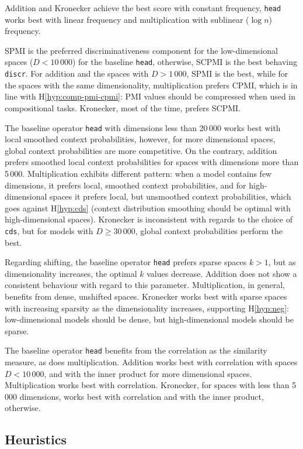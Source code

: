 Addition and Kronecker achieve the best score with constant frequency, \texttt{head} works best with linear frequency and multiplication with sublinear ($\log n$) frequency.

SPMI is the preferred discriminativeness component for the low-dimensional spaces ($D < 10\,000$) for the baseline \texttt{head}, otherwise, SCPMI is the best behaving \texttt{discr}. For addition and the spaces with $D > 1\,000$, SPMI is the best, while for the spaces with the same dimensionality, multiplication prefers CPMI, which is in line with H\ref{hyp:comp-pmi-cpmi}: PMI values should be compressed when used in compositional tasks. Kronecker, most of the time, prefers SCPMI.

The baseline operator \texttt{head} with dimensions less than 20\,000 works best with local smoothed context probabilities, however, for more dimensional spaces, global context probabilities are more competitive. On the contrary, addition prefers smoothed local context probabilities for spaces with dimensions more than 5\,000. Multiplication exhibits different pattern: when a model contains few dimensions, it prefers local, smoothed context probabilities, and for high-dimensional spaces it prefers local, but unsmoothed context probabilities, which goes against H\ref{hyp:cds} (context distribution smoothing should be optimal with high-dimensional spaces). Kronecker is inconsistent with regards to the choice of \texttt{cds}, but for models with $D \geq 30\,000$, global context probabilities perform the best.

Regarding shifting, the baseline operator \texttt{head} prefers sparse spaces $k > 1$, but as dimensionality increases, the optimal $k$ values decrease. Addition does not show a consistent behaviour with regard to this parameter. Multiplication, in general, benefits from dense, unshifted spaces. Kronecker works best with sparse spaces with increasing sparsity as the dimensionality increases, supporting H\ref{hyp:neg}: low-dimensional models should be dense, but high-dimensional models should be sparse.

The baseline operator \texttt{head} benefits from the correlation as the similarity measure, as does multiplication. Addition works best with correlation with spaces $D < 10\,000$, and with the inner product for more dimensional spaces. Multiplication works best with correlation. Kronecker, for spaces with less than 5\,000 dimensions, works best with correlation and with the inner product, otherwise.

\subsection{Heuristics}
\label{sec:heuristics-phraserel}

